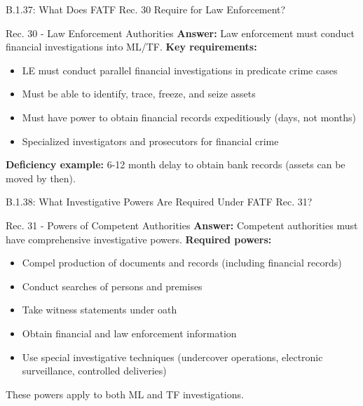 \documentclass{beamer}
\begin{document}
	\begin{frame}{B.1.37: What Does FATF Rec. 30 Require for Law Enforcement?}
		\begin{block}{Rec. 30 - Law Enforcement Authorities}
			\textbf{Answer:} Law enforcement must conduct financial investigations into ML/TF.
			\vspace{0.2cm}
			\textbf{Key requirements:}
			\begin{itemize}
				\item LE must conduct parallel financial investigations in predicate crime cases
				\item Must be able to identify, trace, freeze, and seize assets
				\item Must have power to obtain financial records expeditiously (days, not months)
				\item Specialized investigators and prosecutors for financial crime
			\end{itemize}
			\textbf{Deficiency example:} 6-12 month delay to obtain bank records (assets can be moved by then).
		\end{block}
	\end{frame}
	
	\begin{frame}{B.1.38: What Investigative Powers Are Required Under FATF Rec. 31?}
		\begin{block}{Rec. 31 - Powers of Competent Authorities}
			\textbf{Answer:} Competent authorities must have comprehensive investigative powers.
			\vspace{0.2cm}
			\textbf{Required powers:}
			\begin{itemize}
				\item Compel production of documents and records (including financial records)
				\item Conduct searches of persons and premises
				\item Take witness statements under oath
				\item Obtain financial and law enforcement information
				\item Use special investigative techniques (undercover operations, electronic surveillance, controlled deliveries)
			\end{itemize}
			These powers apply to both ML and TF investigations.
		\end{block}
	\end{frame}
	
\end{document}
